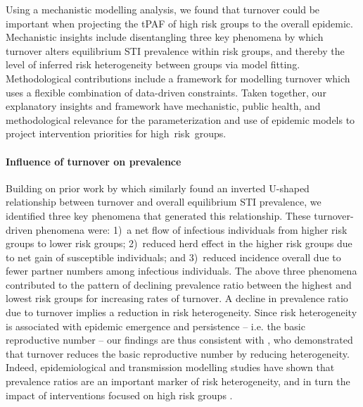 Using a mechanistic modelling analysis,
we found that turnover could be important when
projecting the tPAF of high risk groups to the overall epidemic.
Mechanistic insights include disentangling
three key phenomena by which turnover
alters equilibrium STI prevalence within risk groups,
and thereby the level of inferred risk heterogeneity between groups via model fitting.
Methodological contributions include a  framework for modelling turnover
which uses a flexible combination of data-driven constraints.
Taken together, our explanatory insights and framework
have mechanistic, public health, and methodological relevance for
the parameterization and use of epidemic models
to project intervention priorities for high~risk~groups. %
\paragraph{Influence of turnover on prevalence}
Building on prior work by \citet{Stigum1994,Zhang2012,Henry2015}
which similarly found an inverted U-shaped relationship between
turnover and overall equilibrium STI prevalence,
we identified three key phenomena that generated this relationship.
These turnover-driven phenomena were:
1)~a net flow of infectious individuals from higher risk groups to lower risk groups;
2)~reduced herd effect in the higher risk groups due to net gain of susceptible individuals; and
3)~reduced incidence overall due to fewer partner numbers among infectious individuals.
The above three phenomena contributed to the pattern
of declining prevalence ratio between the highest and lowest risk groups
for increasing rates of turnover.
A decline in prevalence ratio due to turnover implies a reduction in risk heterogeneity.
Since risk heterogeneity is associated with epidemic emergence and persistence \citep{May1988}
-- i.e. the basic reproductive number --
our findings are thus consistent with \citet{Henry2015},
who demonstrated that turnover reduces the basic reproductive number by reducing heterogeneity.
Indeed, epidemiological and transmission modelling studies have shown that prevalence ratios
are an important marker of risk heterogeneity, and in turn
the impact of interventions focused on high risk groups \citep{Baral2012,Mishra2012}.
